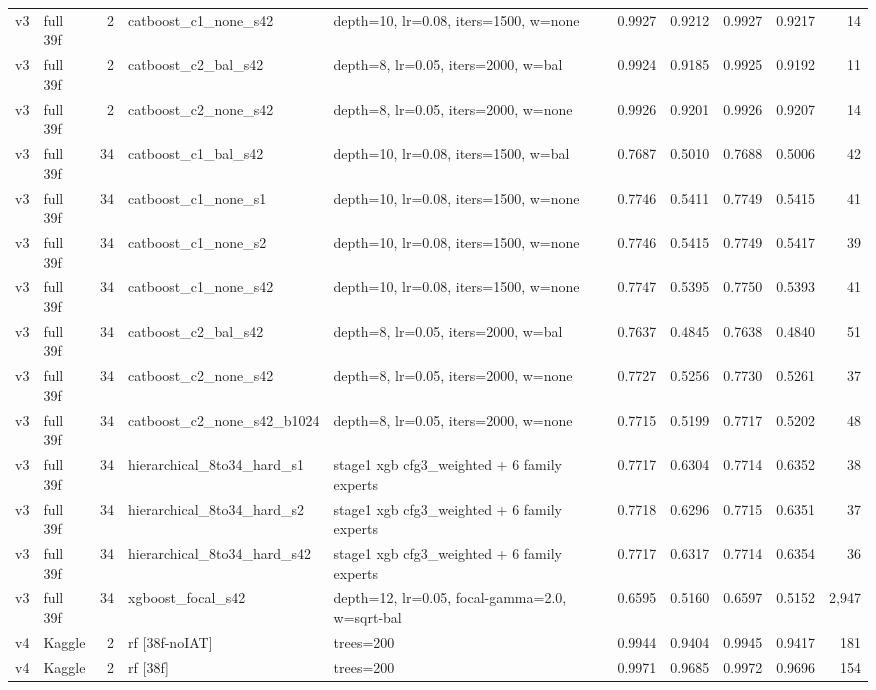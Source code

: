 {\begin{longtable}{llrp{3.2cm}p{4.4cm}rrrrr}
v3 & full 39f & 2 & catboost\_c1\_none\_s42 & depth=10, lr=0.08, iters=1500, w=none & 0.9927 & 0.9212 & 0.9927 & 0.9217 & 14 \\
v3 & full 39f & 2 & catboost\_c2\_bal\_s42 & depth=8, lr=0.05, iters=2000, w=bal & 0.9924 & 0.9185 & 0.9925 & 0.9192 & 11 \\
v3 & full 39f & 2 & catboost\_c2\_none\_s42 & depth=8, lr=0.05, iters=2000, w=none & 0.9926 & 0.9201 & 0.9926 & 0.9207 & 14 \\
v3 & full 39f & 34 & catboost\_c1\_bal\_s42 & depth=10, lr=0.08, iters=1500, w=bal & 0.7687 & 0.5010 & 0.7688 & 0.5006 & 42 \\
v3 & full 39f & 34 & catboost\_c1\_none\_s1 & depth=10, lr=0.08, iters=1500, w=none & 0.7746 & 0.5411 & 0.7749 & 0.5415 & 41 \\
v3 & full 39f & 34 & catboost\_c1\_none\_s2 & depth=10, lr=0.08, iters=1500, w=none & 0.7746 & 0.5415 & 0.7749 & 0.5417 & 39 \\
v3 & full 39f & 34 & catboost\_c1\_none\_s42 & depth=10, lr=0.08, iters=1500, w=none & 0.7747 & 0.5395 & 0.7750 & 0.5393 & 41 \\
v3 & full 39f & 34 & catboost\_c2\_bal\_s42 & depth=8, lr=0.05, iters=2000, w=bal & 0.7637 & 0.4845 & 0.7638 & 0.4840 & 51 \\
v3 & full 39f & 34 & catboost\_c2\_none\_s42 & depth=8, lr=0.05, iters=2000, w=none & 0.7727 & 0.5256 & 0.7730 & 0.5261 & 37 \\
v3 & full 39f & 34 & catboost\_c2\_none\_s42\_b1024 & depth=8, lr=0.05, iters=2000, w=none & 0.7715 & 0.5199 & 0.7717 & 0.5202 & 48 \\
v3 & full 39f & 34 & hierarchical\_8to34\_hard\_s1 & stage1 xgb cfg3\_weighted + 6 family experts & 0.7717 & 0.6304 & 0.7714 & 0.6352 & 38 \\
v3 & full 39f & 34 & hierarchical\_8to34\_hard\_s2 & stage1 xgb cfg3\_weighted + 6 family experts & 0.7718 & 0.6296 & 0.7715 & 0.6351 & 37 \\
v3 & full 39f & 34 & hierarchical\_8to34\_hard\_s42 & stage1 xgb cfg3\_weighted + 6 family experts & 0.7717 & 0.6317 & 0.7714 & 0.6354 & 36 \\
v3 & full 39f & 34 & xgboost\_focal\_s42 & depth=12, lr=0.05, focal-gamma=2.0, w=sqrt-bal & 0.6595 & 0.5160 & 0.6597 & 0.5152 & 2,947 \\
v4 & Kaggle & 2 & rf [38f-noIAT] & trees=200 & 0.9944 & 0.9404 & 0.9945 & 0.9417 & 181 \\
v4 & Kaggle & 2 & rf [38f] & trees=200 & 0.9971 & 0.9685 & 0.9972 & 0.9696 & 154 \\

\end{longtable}}
